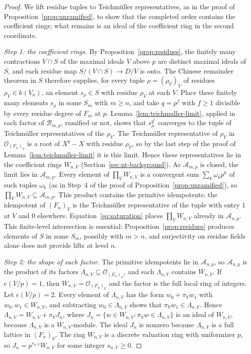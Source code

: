 \documentclass[11pt]{article}
\theoremstyle{plain}
\theoremstyle{definition}
\theoremstyle{remark}
\newcommand{\OO}{\mathcal O}
\begin{document}
\begin{proof}
We lift residue tuples to Teichm\"uller representatives, as in the proof
of Proposition~\ref{prop:unramified}, to show that the completed order
contains the coefficient rings; what remains is an ideal of the
coefficient ring in the second coordinate.

\emph{Step 1: the coefficient rings.}  By Proposition~\ref{prop:residues},
the finitely many contractions $V\cap S$ of the maximal ideals $V$ above
$p$ are distinct maximal ideals of $S$, and each residue map
$S/(V\cap S)\to D/V$ is onto.  The Chinese remainder theorem in $S$
therefore supplies, for every tuple $\rho=(\rho_V)_V$ of residues
$\rho_V\in k(V_n)$, an element $s_\rho\in S$ with residue $\rho_V$ at
each $V$.  Place these finitely many elements $s_\rho$ in some $S_m$ with
$m\geq n$, and take $q=p^f$ with $f\geq1$ divisible by every residue
degree of $F_m$ at $p$.  Lemma~\ref{lem:teichmuller-limit}, applied in
each factor of $\mathcal B_{m,p}$, ramified or not, shows that
$s_\rho^{q^r}$ converges to the tuple of Teichm\"uller representatives of
the $\rho_V$.  The Teichm\"uller representative of $\rho_V$ in
$\OO_{(F_n)_V}$ is a root of $X^q-X$ with residue $\rho_V$, so by the last
step of the proof of Lemma~\ref{lem:teichmuller-limit} it is this limit.
Hence these representatives lie in the coefficient rings $W_{n,V}$
(Section~\ref{sec:nt-background}).  As $\mathcal A_{m,p}$ is closed, the
limit lies in $\mathcal A_{m,p}$.  Every element of $\prod_VW_{n,V}$ is a convergent
sum $\sum_k\omega_kp^k$ of such tuples $\omega_k$ (as in Step~4 of the
proof of Proposition~\ref{prop:unramified}), so
$\prod_VW_{n,V}\subseteq\mathcal A_{m,p}$.  This product contains the
primitive idempotents: the idempotent of $(F_n)_V$ is the Teichm\"uller
representative of the tuple with entry $1$ at $V$ and $0$ elsewhere.
Equation~\eqref{eq:saturation} places $\prod_VW_{n,V}$ already in
$\mathcal A_{n,p}$.  This finite-level intersection is essential:
Proposition~\ref{prop:residues} produces elements of $S$ in some $S_m$,
possibly with $m>n$, and surjectivity on residue fields alone does not
provide lifts at level $n$.

\emph{Step 2: the shape of each factor.}  The primitive idempotents lie
in $\mathcal A_{n,p}$, so $\mathcal A_{n,p}$ is the product of its
factors $\Lambda_{n,V}\subseteq\OO_{(F_n)_V}$, and each $\Lambda_{n,V}$
contains $W_{n,V}$.  If $e(V/p)=1$, then $W_{n,V}=\OO_{(F_n)_V}$ and the
factor is the full local ring of integers.  Let $e(V/p)=2$.  Every
element of $\Lambda_{n,V}$ has the form $w_0+\pi_Vw_1$ with
$w_0,w_1\in W_{n,V}$, and subtracting $w_0\in\Lambda_{n,V}$ shows that
$\pi_Vw_1\in\Lambda_{n,V}$.  Hence $\Lambda_{n,V}=W_{n,V}+\pi_VJ_n$,
where $J_n=\{w\in W_{n,V}:\pi_Vw\in\Lambda_{n,V}\}$ is an ideal of
$W_{n,V}$, because $\Lambda_{n,V}$ is a $W_{n,V}$-module.  The ideal $J_n$
is nonzero because $\Lambda_{n,V}$ is a full lattice in $(F_n)_V$.  The
ring $W_{n,V}$ is a discrete valuation ring with uniformizer $p$, so
$J_n=p^{s_{n,V}}W_{n,V}$ for some integer $s_{n,V}\geq0$.


\end{proof}
\end{document}
